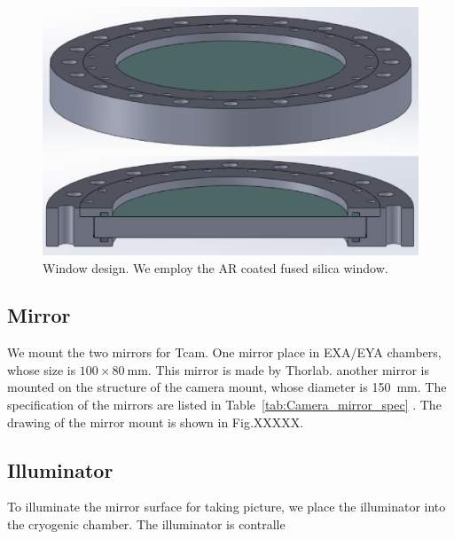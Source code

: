 \begin{figure}
\begin{center}
\includegraphics[width=12cm]{Figures/Camera_view_window.eps}
\caption{Window design. We employ the AR coated fused silica window.} 
\label{fig:Camera_window} 
\end{center}
\end{figure}

\subsection{Mirror}
We mount the two mirrors for Tcam. One mirror place in EXA/EYA chambers, whose size is $100 \times 80~\mathrm{mm}$. This mirror is made by Thorlab. another mirror is mounted on the structure of the camera mount, whose diameter is 150~mm. The specification of the mirrors are listed in Table~\ref{tab:Camera_mirror_spec} . The drawing of the mirror mount is shown in Fig.XXXXX.



\subsection{Illuminator}
To illuminate the mirror surface for taking picture, we place the illuminator into the cryogenic chamber. The illuminator is contralle


